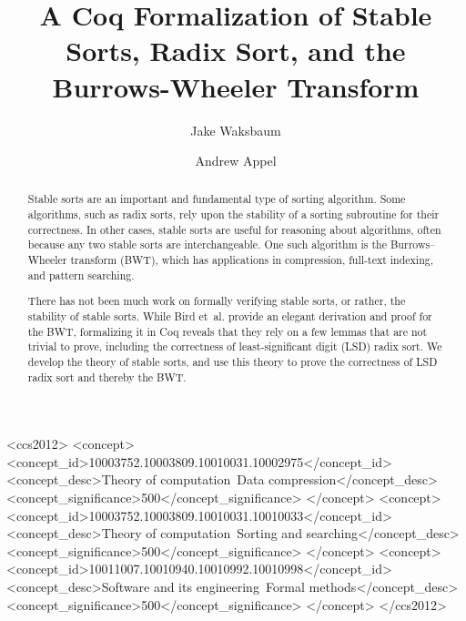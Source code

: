 \documentclass[sigplan,10pt,anonymous,review]{thesis}
\begin{document}
\title[Coq Formalization of Stable Sorts, Radix Sort, and BWT]{A Coq
  Formalization of Stable Sorts, Radix Sort, and the Burrows-Wheeler
  Transform}

\author{Jake Waksbaum}

\author{Andrew Appel}

\begin{abstract}
Stable sorts are an important and fundamental type of sorting
algorithm. Some algorithms, such as radix sorts, rely upon the
stability of a sorting subroutine for their correctness. In other
cases, stable sorts are useful for reasoning about algorithms, often
because any two stable sorts are interchangeable. One such algorithm
is the Burrows--Wheeler transform (BWT), which has applications in
compression, full-text indexing, and pattern searching.

There has not been much work on formally verifying stable sorts, or
rather, the stability of stable sorts. While Bird et~al.
\cite{birdmu,pearls} provide an elegant derivation and proof for the
BWT, formalizing it in Coq reveals that they rely on a few lemmas that
are not trivial to prove, including the correctness of
least-significant digit (LSD) radix sort. We develop the theory of
stable sorts, and use this theory to prove the correctness of LSD
radix sort and thereby the BWT.
\end{abstract}

\begin{CCSXML} <ccs2012>
<concept>
<concept_id>10003752.10003809.10010031.10002975</concept_id>
<concept_desc>Theory of computation~Data compression</concept_desc>
<concept_significance>500</concept_significance>
</concept>
<concept>
<concept_id>10003752.10003809.10010031.10010033</concept_id>
<concept_desc>Theory of computation~Sorting and searching</concept_desc>
<concept_significance>500</concept_significance>
</concept>
<concept>
<concept_id>10011007.10010940.10010992.10010998</concept_id>
<concept_desc>Software and its engineering~Formal methods</concept_desc>
<concept_significance>500</concept_significance>
</concept>
</ccs2012>
\end{CCSXML}
\end{document}
